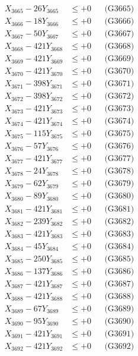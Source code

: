 \documentclass[a4paper,10pt]{article}
\begin{document}
{\begin{align}
X_{3665} - 26Y_{3665} &\leq +0 && \text{(G3665)} \\
X_{3666} - 18Y_{3666} &\leq +0 && \text{(G3666)} \\
X_{3667} - 50Y_{3667} &\leq +0 && \text{(G3667)} \\
X_{3668} - 421Y_{3668} &\leq +0 && \text{(G3668)} \\
X_{3669} - 421Y_{3669} &\leq +0 && \text{(G3669)} \\
X_{3670} - 421Y_{3670} &\leq +0 && \text{(G3670)} \\
\allowbreak
X_{3671} - 398Y_{3671} &\leq +0 && \text{(G3671)} \\
X_{3672} - 398Y_{3672} &\leq +0 && \text{(G3672)} \\
X_{3673} - 421Y_{3673} &\leq +0 && \text{(G3673)} \\
X_{3674} - 421Y_{3674} &\leq +0 && \text{(G3674)} \\
X_{3675} - 115Y_{3675} &\leq +0 && \text{(G3675)} \\
X_{3676} - 57Y_{3676} &\leq +0 && \text{(G3676)} \\
X_{3677} - 421Y_{3677} &\leq +0 && \text{(G3677)} \\
X_{3678} - 24Y_{3678} &\leq +0 && \text{(G3678)} \\
X_{3679} - 62Y_{3679} &\leq +0 && \text{(G3679)} \\
X_{3680} - 89Y_{3680} &\leq +0 && \text{(G3680)} \\
\allowbreak
X_{3681} - 421Y_{3681} &\leq +0 && \text{(G3681)} \\
X_{3682} - 239Y_{3682} &\leq +0 && \text{(G3682)} \\
X_{3683} - 421Y_{3683} &\leq +0 && \text{(G3683)} \\
X_{3684} - 45Y_{3684} &\leq +0 && \text{(G3684)} \\
X_{3685} - 250Y_{3685} &\leq +0 && \text{(G3685)} \\
X_{3686} - 137Y_{3686} &\leq +0 && \text{(G3686)} \\
X_{3687} - 421Y_{3687} &\leq +0 && \text{(G3687)} \\
X_{3688} - 421Y_{3688} &\leq +0 && \text{(G3688)} \\
X_{3689} - 67Y_{3689} &\leq +0 && \text{(G3689)} \\
X_{3690} - 95Y_{3690} &\leq +0 && \text{(G3690)} \\
\allowbreak
X_{3691} - 421Y_{3691} &\leq +0 && \text{(G3691)} \\
X_{3692} - 421Y_{3692} &\leq +0 && \text{(G3692)} \\

\end{align}}
\end{document}
